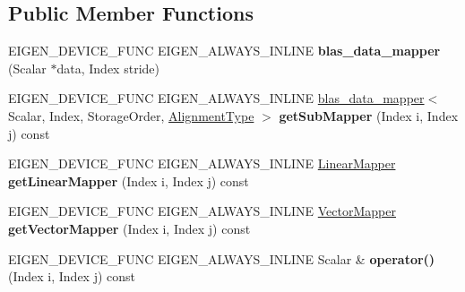 \subsection*{Public Member Functions}
\begin{DoxyCompactItemize}
\item 
\mbox{\label{class_eigen_1_1internal_1_1blas__data__mapper_adb0990f4121cc371ff39e18243fa7f75}} 
E\+I\+G\+E\+N\+\_\+\+D\+E\+V\+I\+C\+E\+\_\+\+F\+U\+NC E\+I\+G\+E\+N\+\_\+\+A\+L\+W\+A\+Y\+S\+\_\+\+I\+N\+L\+I\+NE {\bfseries blas\+\_\+data\+\_\+mapper} (Scalar $\ast$data, Index stride)
\item 
\mbox{\label{class_eigen_1_1internal_1_1blas__data__mapper_a3ec8250149dcb94a1adabeaca916e022}} 
E\+I\+G\+E\+N\+\_\+\+D\+E\+V\+I\+C\+E\+\_\+\+F\+U\+NC E\+I\+G\+E\+N\+\_\+\+A\+L\+W\+A\+Y\+S\+\_\+\+I\+N\+L\+I\+NE \mbox{\hyperlink{class_eigen_1_1internal_1_1blas__data__mapper}{blas\+\_\+data\+\_\+mapper}}$<$ Scalar, Index, Storage\+Order, \mbox{\hyperlink{group__enums_ga45fe06e29902b7a2773de05ba27b47a1}{Alignment\+Type}} $>$ {\bfseries get\+Sub\+Mapper} (Index i, Index j) const
\item 
\mbox{\label{class_eigen_1_1internal_1_1blas__data__mapper_a8564af1d8d9304f73e40bd11caf319f7}} 
E\+I\+G\+E\+N\+\_\+\+D\+E\+V\+I\+C\+E\+\_\+\+F\+U\+NC E\+I\+G\+E\+N\+\_\+\+A\+L\+W\+A\+Y\+S\+\_\+\+I\+N\+L\+I\+NE \mbox{\hyperlink{class_eigen_1_1internal_1_1_blas_linear_mapper}{Linear\+Mapper}} {\bfseries get\+Linear\+Mapper} (Index i, Index j) const
\item 
\mbox{\label{class_eigen_1_1internal_1_1blas__data__mapper_acd275391ce4e8698f1c4001bdc7f17e6}} 
E\+I\+G\+E\+N\+\_\+\+D\+E\+V\+I\+C\+E\+\_\+\+F\+U\+NC E\+I\+G\+E\+N\+\_\+\+A\+L\+W\+A\+Y\+S\+\_\+\+I\+N\+L\+I\+NE \mbox{\hyperlink{class_eigen_1_1internal_1_1_blas_vector_mapper}{Vector\+Mapper}} {\bfseries get\+Vector\+Mapper} (Index i, Index j) const
\item 
\mbox{\label{class_eigen_1_1internal_1_1blas__data__mapper_acfc17ca5e17082a5ec461875239dfdbc}} 
E\+I\+G\+E\+N\+\_\+\+D\+E\+V\+I\+C\+E\+\_\+\+F\+U\+NC E\+I\+G\+E\+N\+\_\+\+A\+L\+W\+A\+Y\+S\+\_\+\+I\+N\+L\+I\+NE Scalar \& {\bfseries operator()} (Index i, Index j) const

\end{DoxyCompactItemize}
